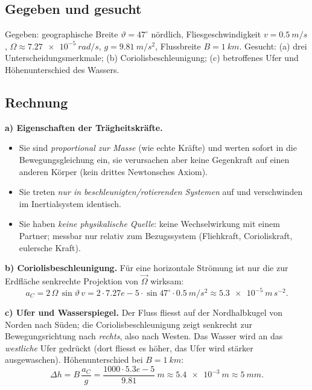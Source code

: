 
\subsection*{Gegeben und gesucht}
Gegeben: geographische Breite $\vartheta=47^\circ$ nördlich,
Fliesgeschwindigkeit $v=\qty{0.5}{m/s}$, $\Omega\approx\qty{7.27e-5}{rad/s}$,
$g=\qty{9.81}{m/s^2}$, Flussbreite $B=\qty{1}{km}$.
Gesucht: (a) drei Unterscheidungsmerkmale; (b) Coriolisbeschleunigung;
(c) betroffenes Ufer und Höhenunterschied des Wassers.

\subsection*{Rechnung}
\textbf{a) Eigenschaften der Trägheitskräfte.}
\begin{itemize}
  \item Sie sind \emph{proportional zur Masse} (wie echte Kräfte) und
       werten sofort in die Bewegungsgleichung ein, sie verursachen aber
       keine Gegenkraft auf einen anderen Körper (kein drittes
       Newtonsches Axiom).
  \item Sie treten \emph{nur in beschleunigten/rotierenden Systemen} auf und
       verschwinden im Inertialsystem identisch.
  \item Sie haben \emph{keine physikalische Quelle}: keine Wechselwirkung
       mit einem Partner; messbar nur relativ zum Bezugssystem
       (Fliehkraft, Corioliskraft, eulersche Kraft).
\end{itemize}

\textbf{b) Coriolisbeschleunigung.} Für eine horizontale Strömung ist nur die
zur Erdfläche senkrechte Projektion von $\vec\Omega$ wirksam:
\begin{equation}
  a_C = 2\,\Omega\,\sin\vartheta\, v
  = 2\cdot 7.27e-5\cdot \sin47^{\circ}\cdot 0.5\ \si{m/s^2}
  \approx \qty{5.3e-5}{m\,s^{-2}}.
\end{equation}

\textbf{c) Ufer und Wasserspiegel.} Der Fluss fliesst auf der Nordhalbkugel
von Norden nach Süden; die Coriolisbeschleunigung zeigt senkrecht zur
Bewegungsrichtung nach \emph{rechts}, also nach Westen. Das Wasser wird an das
\emph{westliche} Ufer gedrückt (dort fliesst es höher, das Ufer wird stärker
ausgewaschen). Höhenunterschied bei $B=\qty{1}{km}$:
\begin{equation}
  \Delta h = B\,\frac{a_C}{g}
  = \frac{1000\cdot 5.3e-5}{9.81}\ \si{m}
  \approx \qty{5.4e-3}{m} \approx \qty{5}{mm}.
\end{equation}

